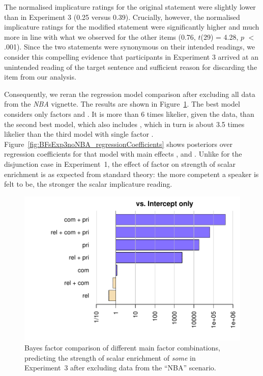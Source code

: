 \documentclass[12pt]{article}
\begin{document}
The normalised implicature ratings for the original statement were slightly lower than in
Experiment 3 (0.25 versus 0.39). Crucially, however, the normalised implicature ratings for the
modified statement were significantly higher and much more in line with what we observed for
the other items (0.76, $t$(29) = 4.28, $p$ $<$ .001). Since the two statements were synonymous
on their intended readings, we consider this compelling evidence that participants in
Experiment 3 arrived at an unintended reading of the target sentence and sufficient reason for
discarding the item from our analysis.

Consequently, we reran the regression model comparison after excluding all data from the
\emph{NBA} vignette. The results are shown in Figure~\ref{fig:BFsExp3noNBA}. The best model
considers only factors \com and \pri. It is more than 6 times likelier, given the data, than
the second best model, which also includes \rel, which in turn is about 3.5 times likelier than
the third model with single factor \pri. Figure~\ref{fig:BFsExp3noNBA_regressionCoefficients}
shows posteriors over regression coefficients for that model with main effects \rel, \com and
\pri. Unlike for the disjunction case in Experiment~1, the effect of factor \com on strength of
scalar enrichment is as expected from standard theory: the more competent a speaker is felt to
be, the stronger the scalar implicature reading.


\begin{figure}
  \centering
  \includegraphics[width = 0.8 \textwidth]{pics/bfsAllExp3_noNBA.pdf}
  \caption{Bayes factor comparison of different main factor combinations, predicting the
    strength of scalar enrichment of \emph{some} in Experiment~3 after excluding data from the
    ``NBA'' scenario.}
  \label{fig:BFsExp3noNBA}
\end{figure}
\end{document}
